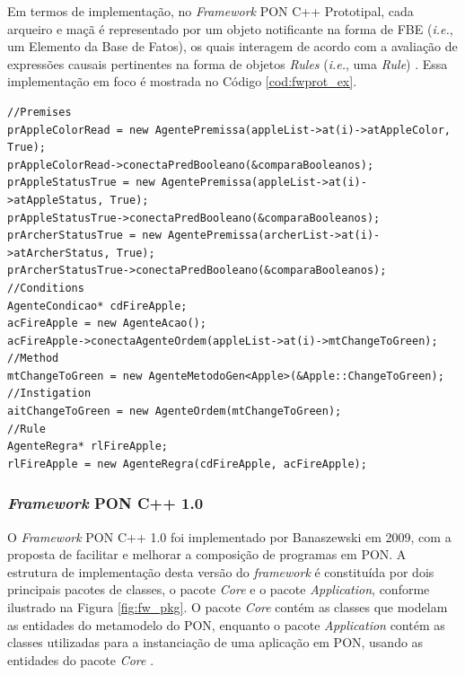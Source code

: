 Em termos de implementação, no \textit{Framework} PON C++ Prototipal, cada
arqueiro e maçã é representado por um objeto notificante na forma de FBE
(\textit{i.e.}, um Elemento da Base de Fatos), os quais interagem de acordo com
a avaliação de expressões causais pertinentes na forma de objetos \textit{Rules}
(\textit{i.e.}, uma \textit{Rule}) \cite{msc_Banaszewski_2009}. Essa
implementação em foco é mostrada no Código \ref{cod:fwprot_ex}.

\begin{lstlisting}[caption = {Exemplo de programa com o \textit{framework} C++ prototipal},
  source = {Adaptado de \citeonline{msc_Banaszewski_2009}},
  label = {cod:fwprot_ex}, float=htb]
//Premises
prAppleColorRead = new AgentePremissa(appleList->at(i)->atAppleColor, True);
prAppleColorRead->conectaPredBooleano(&comparaBooleanos);
prAppleStatusTrue = new AgentePremissa(appleList->at(i)->atAppleStatus, True);
prAppleStatusTrue->conectaPredBooleano(&comparaBooleanos);
prArcherStatusTrue = new AgentePremissa(archerList->at(i)->atArcherStatus, True);
prArcherStatusTrue->conectaPredBooleano(&comparaBooleanos);
//Conditions
AgenteCondicao* cdFireApple;
acFireApple = new AgenteAcao();
acFireApple->conectaAgenteOrdem(appleList->at(i)->mtChangeToGreen);
//Method
mtChangeToGreen = new AgenteMetodoGen<Apple>(&Apple::ChangeToGreen);
//Instigation
aitChangeToGreen = new AgenteOrdem(mtChangeToGreen);
//Rule
AgenteRegra* rlFireApple;
rlFireApple = new AgenteRegra(cdFireApple, acFireApple);
\end{lstlisting}

\vspace{-1cm}
\subsubsection{\textit{Framework} PON C++ 1.0}

O \textit{Framework} PON C++ 1.0 foi implementado por Banaszewski em 2009, com a
proposta de facilitar e melhorar a composição de programas em PON. A estrutura
de implementação desta versão do \textit{framework} é constituída por dois
principais pacotes de classes, o pacote \textit{Core} e o pacote
\textit{Application}, conforme ilustrado na Figura \ref{fig:fw_pkg}. O pacote
\textit{Core} contém as classes que modelam as entidades do metamodelo do PON,
enquanto o pacote \textit{Application} contém as classes utilizadas para a
instanciação de uma aplicação em PON, usando as entidades do pacote
\textit{Core} \cite{msc_Banaszewski_2009}.

